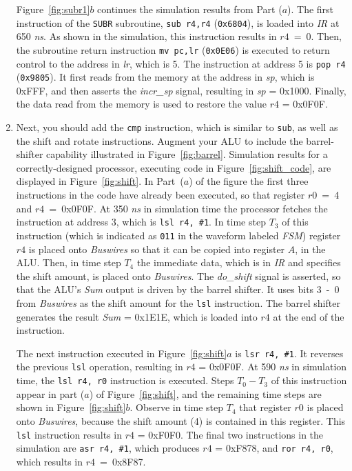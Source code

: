 \documentclass[epsfig,10pt,fullpage]{article} \addtolength{\textwidth}{1.5in}
\begin{document}
\begin{enumerate}
Figure~\ref{fig:subr1}$b$ continues the simulation results from Part ($a$). The first instruction 
of the \texttt{SUBR} subroutine, \texttt{sub~r4,r4} (\texttt{0x6804}), is loaded into 
{\it IR} at 650 {\it ns}. As shown in the simulation, this instruction results
in $r4$~=~0. Then, the subroutine
return instruction \texttt{mv~pc,lr} (\texttt{0x0E06}) is executed to return control to 
the address in {\it lr}, which is 5. The instruction at address 5 is \texttt{pop~r4}
(\texttt{0x9805}). It first reads from the memory at the address in 
{\it sp}, which is 0xFFF, and then asserts the {\it incr\_sp} signal, resulting in 
{\it sp} = 0x1000. Finally, the data read 
from the memory is used to restore the value $r4$ = 0x0F0F. 

\item Next, you should add the \texttt{cmp} instruction, which is similar to \texttt{sub}, as 
well as the shift and rotate instructions. Augment your ALU to include the barrel-shifter
capability illustrated in Figure~\ref{fig:barrel}. Simulation results for a
correctly-designed processor, executing code in Figure~\ref{fig:shift_code}, are displayed 
in Figure~\ref{fig:shift}.  In Part~($a$)
of the figure the first three instructions in the
code have already been executed, so that register $r0$~=~4 and $r4$~=~0x0F0F. 
At 350 {\it ns} in simulation time the processor fetches the instruction at address 3, which 
is \texttt{lsl~r4, \#1}. In time step $T_3$ of this instruction (which is indicated as
\texttt{011} in the waveform 
labeled {\it FSM}) register $r4$ is placed onto {\it Buswires} so that it can be copied into 
register $A$, in the ALU. Then, in time step $T_4$ the immediate data, which is 
in {\it IR} and specifies the shift amount, is placed onto {\it Buswires}. 
The {\it do\_shift} signal is asserted, so
that the ALU's {\it Sum} output is driven by the barrel shifter. It uses bits 3~-~0 from 
{\it Buswires} as the shift amount for the \texttt{lsl} instruction. The barrel shifter 
generates the result {\it Sum} = 0x1E1E, which is loaded into $r4$ at the end of
the instruction.

The next instruction executed in Figure~\ref{fig:shift}$a$ is \texttt{lsr~r4, \#1}. It
reverses the previous \texttt{lsl} operation, resulting in $r4$ = 0x0F0F. At 590 {\it ns}
in simulation time, the \texttt{lsl r4, r0} instruction is executed. Steps $T_0 -
T_3$ of this instruction appear in part ($a$) of 
Figure~\ref{fig:shift}, and the remaining time steps are
shown in Figure~\ref{fig:shift}$b$. Observe in time step $T_4$ that register $r0$ is
placed onto {\it Buswires}, because the shift amount (4) is contained in this register. 
This \texttt{lsl} instruction results in $r4$ = 0xF0F0. The final two instructions in the 
simulation are \texttt{asr r4, \#1}, which produces $r4$ = 0xF878, and \texttt{ror r4, r0},
which results in $r4$~=~0x8F87.



\end{enumerate}
\end{document}
